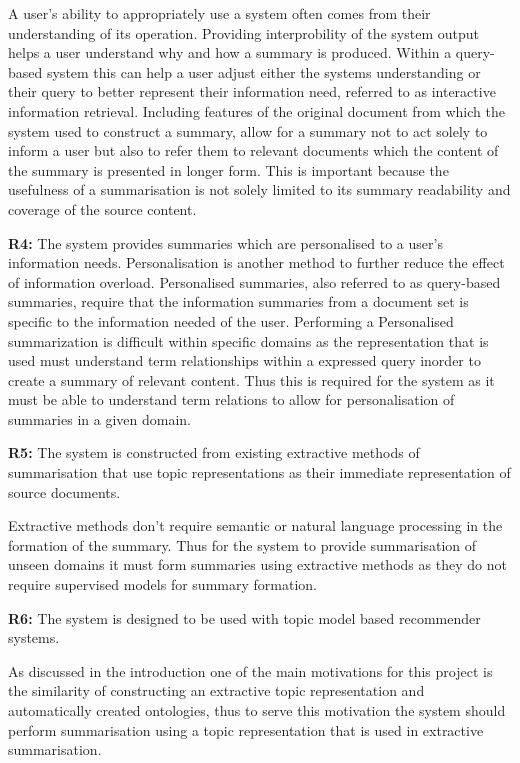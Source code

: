 A user's ability to appropriately use a system often comes from their understanding of its operation. Providing interprobility of the system output helps a user understand why and how a summary is produced. Within a query-based system this can help a user adjust either the systems understanding or their query to better represent their information need, referred to as interactive information retrieval.  Including features of the original document from which the system used to construct a summary, allow for a summary not to act solely to inform a user but also to refer them to relevant documents which the content of the summary is presented in longer form. This is important because the usefulness of a summarisation is not solely limited to its summary readability and coverage of the source content.

\textbf{R4:} The system provides summaries which are personalised to a user's information needs.
\label{r4}
Personalisation is another method to further reduce the effect of information overload. Personalised summaries, also referred to as query-based summaries, require that the information summaries from a document set is specific to the information needed of the user. Performing a Personalised summarization is difficult within specific domains as the representation that is used must understand term relationships within a expressed query inorder to create a summary of relevant content. Thus this is required for the system as it must be able to understand term relations to allow for personalisation of summaries in a given domain.

\textbf{R5:} The system is constructed from existing extractive methods of summarisation that use topic representations as their immediate representation of source documents.
\label{r5}

Extractive methods don’t require semantic or natural language processing in the formation of the summary. Thus for the system to provide summarisation of unseen domains it must form summaries using extractive methods as they do not require supervised models for summary formation.

\textbf{R6:} The system is designed to be used with topic model based recommender systems.
\label{r6}

As discussed in the introduction one of the main motivations for this project is the similarity of constructing an extractive topic representation and automatically created ontologies, thus to serve this motivation the system should perform summarisation using a topic representation that is used in extractive summarisation. 

